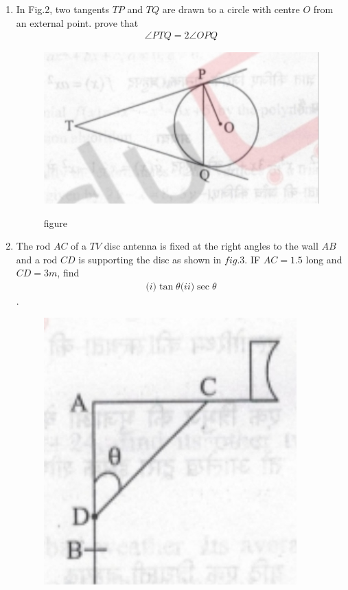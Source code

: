 \documentclass[12pt,-letter paper]{article}
\begin{document}
\begin{enumerate}
	\item In Fig.2, two tangents $TP$ and $TQ$ are drawn to a circle with centre $O$ from an external point. prove that \begin{align}\angle PTQ = 2\angle OPQ\end{align}
		\begin{figure}[H]                                                                         \includegraphics[width=\columnwidth]{./imagecharan2.jpg}                          \label{fig:fig1}                                                                  \caption{figure}                                                          \end{figure}
		\item The rod $AC$ of a $TV$ disc antenna is fixed at the right angles to the wall $AB$ and a rod $CD$ is supporting the disc as shown in $fig.3$. IF $	AC=1.5$ long and $CD=3m$, find \begin{align}\textit{(i)}\tan\theta \textit{(ii)}\sec\theta\end{align}.
	\begin{figure}[H] 
		\includegraphics[width=\columnwidth]{./imagecharan3.jpg} 
		\label{fig:fig1}
		\caption{}
	\end{figure}



\end{enumerate}
\end{document}
